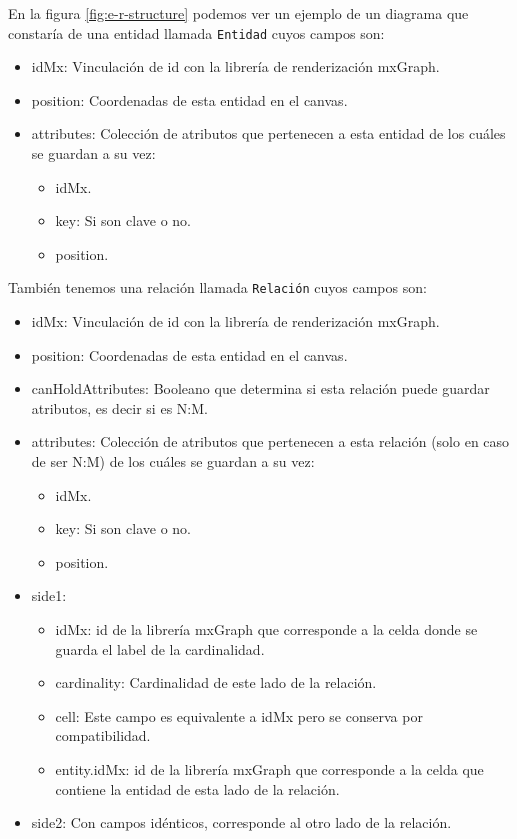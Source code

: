 En la figura \ref{fig:e-r-structure} podemos ver un ejemplo de un diagrama que constaría de una entidad llamada \texttt{Entidad} cuyos campos son:
\begin{itemize}
    \item idMx: Vinculación de id con la librería de renderización mxGraph.
    \item position: Coordenadas de esta entidad en el canvas.
    \item attributes: Colección de atributos que pertenecen a esta entidad de los cuáles se guardan a su vez:
    \begin{itemize}
        \item idMx.
        \item key: Si son clave o no.
        \item position.
    \end{itemize}
\end{itemize}
También tenemos una relación llamada \texttt{Relación} cuyos campos son:
\begin{itemize}
    \item idMx: Vinculación de id con la librería de renderización mxGraph.
    \item position: Coordenadas de esta entidad en el canvas.
    \item canHoldAttributes: Booleano que determina si esta relación puede guardar atributos, es decir si es N:M.
    \item attributes: Colección de atributos que pertenecen a esta relación (solo en caso de ser N:M) de los cuáles se guardan a su vez:
    \begin{itemize}
        \item idMx.
        \item key: Si son clave o no.
        \item position.
    \end{itemize}
    \item side1:
    \begin{itemize}
        \item idMx: id de la librería mxGraph que corresponde a la celda donde se guarda el label de la cardinalidad.
        \item cardinality: Cardinalidad de este lado de la relación.
        \item cell: Este campo es equivalente a idMx pero se conserva por compatibilidad.
        \item entity.idMx: id de la librería mxGraph que corresponde a la celda que contiene la entidad de esta lado de la relación.
    \end{itemize}
    \item side2: Con campos idénticos, corresponde al otro lado de la relación.
\end{itemize}

